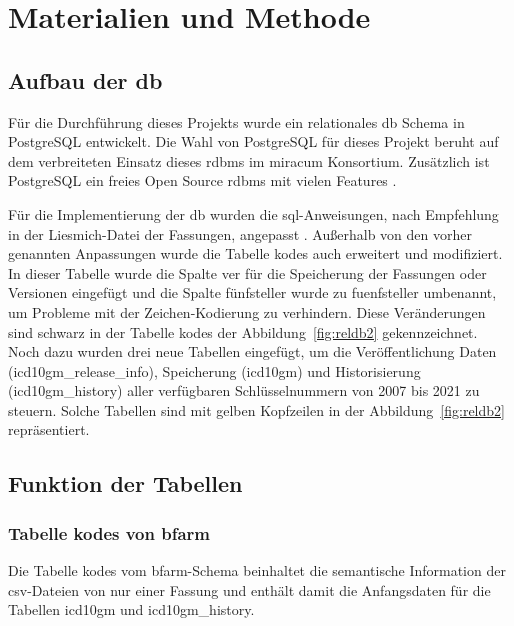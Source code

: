\chapter{Materialien und Methode} \label{ch:database}

\section{Aufbau der \acs{db}} \label{sec:dbdevelop}

Für die Durchführung dieses Projekts wurde ein relationales \ac{db} Schema in PostgreSQL entwickelt. Die Wahl von PostgreSQL für dieses Projekt beruht auf dem verbreiteten Einsatz dieses \ac{rdbms} im \ac{miracum} Konsortium. Zusätzlich ist PostgreSQL ein freies Open Source \ac{rdbms} mit vielen Features \cite{postgres}.

Für die Implementierung der \ac{db} wurden die \ac{sql}-Anweisungen, nach Empfehlung in der Liesmich-Datei der Fassungen, angepasst \cite{readmel}. Außerhalb von den vorher genannten Anpassungen wurde die Tabelle \glqq\textsf{kodes}\grqq{} auch erweitert und modifiziert. In dieser Tabelle wurde die Spalte \glqq\textsf{ver}\grqq{} für die Speicherung der Fassungen oder Versionen eingefügt und die Spalte \glqq\textsf{fünfsteller}\grqq{} wurde zu \glqq\textsf{fuenfsteller}\grqq{} umbenannt, um Probleme mit der Zeichen-Kodierung zu verhindern. Diese Veränderungen sind schwarz in der Tabelle \glqq\textsf{kodes}\grqq{} der Abbildung~\ref{fig:reldb2} gekennzeichnet. Noch dazu wurden drei neue Tabellen eingefügt, um die Veröffentlichung Daten (\glqq\textsf{icd10gm\_release\_info}\grqq{}), Speicherung (\glqq\textsf{icd10gm}\grqq{}) und Historisierung (\glqq\textsf{icd10gm\_history}\grqq{}) aller verfügbaren Schlüsselnummern von 2007 bis 2021 zu steuern. Solche Tabellen sind mit gelben Kopfzeilen in der Abbildung~\ref{fig:reldb2} repräsentiert.

\section{Funktion der Tabellen} \label{sec:functab}

\subsection{Tabelle \glqq\textsf{kodes}\grqq{} von \acs{bfarm}} \label{subsec:bfarmtables}

Die Tabelle \glqq\textsf{kodes}\grqq{} vom \ac{bfarm}-Schema beinhaltet die semantische Information der \ac{csv}-Dateien von nur einer Fassung und enthält damit die Anfangsdaten für die Tabellen \glqq\textsf{icd10gm}\grqq{} und \glqq\textsf{icd10gm\_history}\grqq{}.

